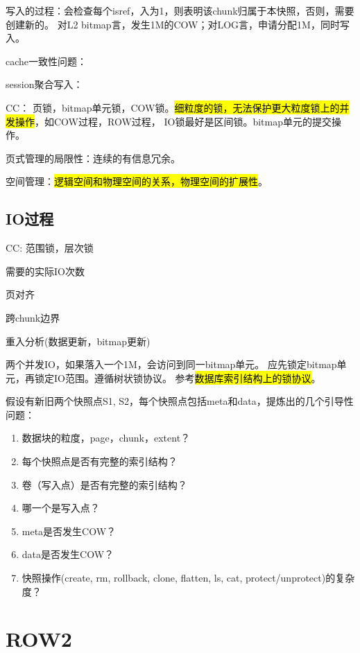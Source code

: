 写入的过程：会检查每个isref，入为1，则表明该chunk归属于本快照，否则，需要创建新的。
对L2 bitmap言，发生1M的COW；对LOG言，申请分配1M，同时写入。

cache一致性问题：

session聚合写入：

CC： 页锁，bitmap单元锁，COW锁。\hl{细粒度的锁，无法保护更大粒度锁上的并发操作}，如COW过程，ROW过程，
IO锁最好是区间锁。bitmap单元的提交操作。

页式管理的局限性：连续的有信息冗余。

空间管理：\hl{逻辑空间和物理空间的关系，物理空间的扩展性}。

\subsection{IO过程}

\begin{itembox}
\item CC: 范围锁，层次锁
\item 需要的实际IO次数
\item 页对齐
\item 跨chunk边界
\item 重入分析(数据更新，bitmap更新)
\end{itembox}

两个并发IO，如果落入一个1M，会访问到同一bitmap单元。
应先锁定bitmap单元，再锁定IO范围。遵循树状锁协议。
参考\hl{数据库索引结构上的锁协议}。

\begin{tcolorbox}

假设有新旧两个快照点S1, S2，每个快照点包括meta和data，提炼出的几个引导性问题：

\begin{enumerate}
    \item 数据块的粒度，page，chunk，extent？
    \item 每个快照点是否有完整的索引结构？
    \item 卷（写入点）是否有完整的索引结构？
    \item 哪一个是写入点？
    \item meta是否发生COW？
    \item data是否发生COW？
    \item 快照操作(create, rm, rollback, clone, flatten, ls, cat, protect/unprotect)的复杂度？
\end{enumerate}

\end{tcolorbox}

\section{ROW2}

